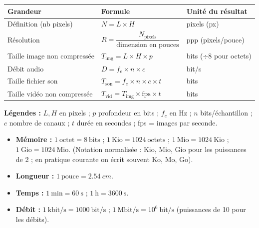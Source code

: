 \documentclass[11pt]{article}
\begin{document}
\begin{propriete}
\begin{center}
\begin{tabularx}{\linewidth}{|l|X|l|}
\hline
\rowcolor{popblueL} \textbf{Grandeur} & \textbf{Formule} & \textbf{Unité du résultat} \\
\hline
Définition (nb pixels) & $N = L \times H$ & pixels (px) \\
\hline
Résolution & $R = \dfrac{N_{\text{pixels}}}{\text{dimension en pouces}}$ & ppp (pixels/pouce) \\
\hline
Taille image non compressée & $T_{\text{img}} = L \times H \times p$ & bits ($\div 8$ pour octets) \\
\hline
Débit audio & $D = f_e \times n \times c$ & bit/s \\
\hline
Taille fichier son & $T_{\text{son}} = f_e \times n \times c \times t$ & bits \\
\hline
Taille vidéo non compressée & $T_{\text{vid}} = T_{\text{img}} \times \text{fps} \times t$ & bits \\
\hline
\end{tabularx}
\end{center}
\textbf{Légendes :} $L, H$ en pixels ; $p$ profondeur en bits ; $f_e$ en Hz ; $n$ bits/échantillon ; $c$ nombre de canaux ; $t$ durée en secondes ; fps = images par seconde.
\end{propriete}

\begin{propriete}
\begin{itemize}
  \item \textbf{Mémoire :} $1~\text{octet} = 8~\text{bits}$ ; $1~\text{Kio} = 1024~\text{octets}$ ; $1~\text{Mio} = 1024~\text{Kio}$ ; $1~\text{Gio} = 1024~\text{Mio}$.
       (Notation normalisée : Kio, Mio, Gio pour les puissances de 2 ; en pratique courante on écrit souvent Ko, Mo, Go).
  \item \textbf{Longueur :} $1~\text{pouce} = \SI{2,54}{cm}$.
  \item \textbf{Temps :} $1~\text{min} = 60~\text{s}$ ; $1~\text{h} = 3600~\text{s}$.
  \item \textbf{Débit :} $1~\text{kbit/s} = 1000~\text{bit/s}$ ; $1~\text{Mbit/s} = 10^6~\text{bit/s}$ (puissances de 10 pour les débits).
\end{itemize}
\end{propriete}
\end{document}
